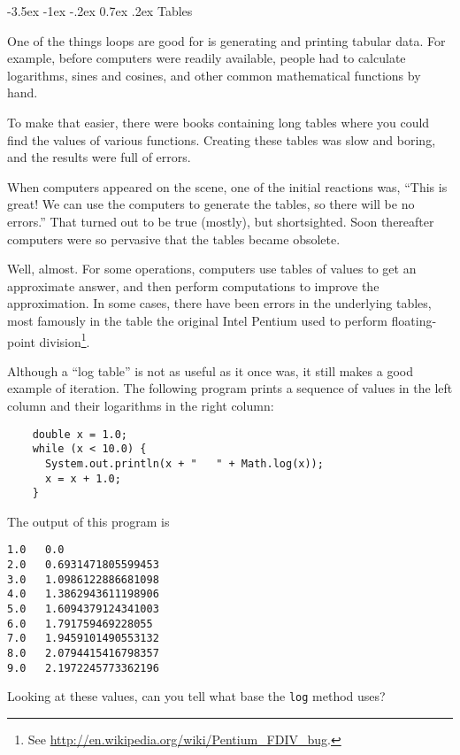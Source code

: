 \documentclass{book}
\makeatletter
\renewcommand{\section}{\@startsection 
    {section} {1} {0mm}%
    {-3.5ex \@plus -1ex \@minus -.2ex}%
    {0.7ex \@plus.2ex}%
    {\normalfont\Large\bfseries}}
\makeatother
\begin{document}
\section{Tables}

One of the things loops are good for is generating and printing
tabular data.  For example, before computers were readily
available, people had to calculate logarithms,
sines and cosines, and other common mathematical functions
by hand.

To make that easier, there were books containing long tables
where you could find the values of various functions.
Creating these tables was slow and boring, and the results
were full of errors.

When computers appeared on the scene, one of the initial reactions
was, ``This is great!  We can use the computers to generate the
tables, so there will be no errors.''  That turned out to be true
(mostly), but shortsighted.  Soon thereafter computers were so
pervasive that the tables became obsolete.

Well, almost.  For some operations, computers use tables of values to
get an approximate answer, and then perform computations to improve
the approximation.  In some cases, there have been errors in the
underlying tables, most famously in the table the original Intel
Pentium used to perform floating-point division\footnote{See
  \url{http://en.wikipedia.org/wiki/Pentium_FDIV_bug}.}.


Although a ``log table'' is not as useful as it once was, it still
makes a good example of iteration.  The following program prints a
sequence of values in the left column and their logarithms in the
right column:

\begin{verbatim}
    double x = 1.0;
    while (x < 10.0) {
      System.out.println(x + "   " + Math.log(x));
      x = x + 1.0;
    }
\end{verbatim}
%
The output of this program is

\begin{verbatim}
1.0   0.0
2.0   0.6931471805599453
3.0   1.0986122886681098
4.0   1.3862943611198906
5.0   1.6094379124341003
6.0   1.791759469228055
7.0   1.9459101490553132
8.0   2.0794415416798357
9.0   2.1972245773362196
\end{verbatim}
%
Looking at these values, can you tell what base the {\tt log}
method uses?
\end{document}

